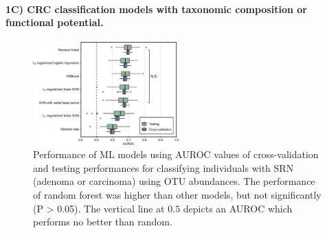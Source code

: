 \documentclass[11pt]{article}
\begin{document}
\paragraph{1C) CRC classification models with taxonomic composition or functional potential.}

\begin{figure}
    \vspace{-20pt}
    \begin{center}
        \includegraphics[width=0.5\textwidth]{figures/topcuoglu_f2.jpg}
        \caption{Performance of ML models using AUROC values of cross-validation and testing performances for classifying individuals with SRN (adenoma or carcinoma) using OTU abundances. The performance of random forest was higher than other models, but not significantly (P > 0.05). The vertical line at $0.5$ depicts an AUROC which performs no better than random. \cite{topcuoglu_framework_2020}}
        \label{fig:rf}
    \end{center}
    \vspace{-20pt}
\end{figure}
\end{document}
